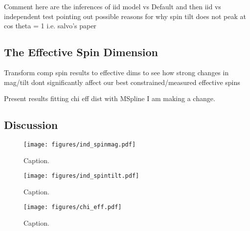 Comment here are the inferences of iid model vs Default and then iid vs independent test pointing out possible reasons for why spin tilt 
does not peak at cos theta = 1 i.e. salvo's paper

\subsection{The Effective Spin Dimension}

Transform comp spin results to effective dims to see how strong changes in mag/tilt dont significantly affect our best constrained/measured
effective spins

Present results fitting chi eff dist with MSpline I am making a change. 

\subsection{Discussion}

\begin{figure}
    \texttt{[image: figures/ind\_spinmag.pdf]}
    \caption{Caption.}
    \label{fig:ind_spinmag_dist}
\end{figure}

\begin{figure}
        \texttt{[image: figures/ind\_spintilt.pdf]}
        \caption{Caption.}
        \label{fig:ind_spintilt_dist}
\end{figure}


\begin{figure}
    \texttt{[image: figures/chi\_eff.pdf]}
    \caption{Caption.}
    \label{fig:chieff_dist}
\end{figure}


